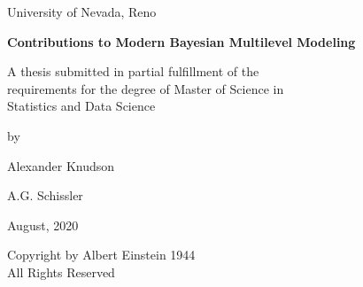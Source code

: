 \documentclass[11pt, oneside]{book}
\begin{document}
\begin{titlepage}
\begin{center}
\vspace*{1in}
University of Nevada, Reno

\vspace{1.5in}
\textbf{Contributions to Modern Bayesian Multilevel Modeling}

\vspace{1in}
A thesis submitted in partial fulfillment of the \\
requirements for the degree of Master of Science in \\
Statistics and Data Science

\vspace{1in}
by

\vspace{1em}
Alexander Knudson

\vspace{2em}
A.G. Schissler

\vspace{3em}
August, 2020

\end{center}
\end{titlepage}
\thispagestyle{empty}
\begin{center}
\vspace*{\fill}
Copyright by Albert Einstein 1944 \\
All Rights Reserved
\vspace*{\fill}
\end{center}
\end{document}
